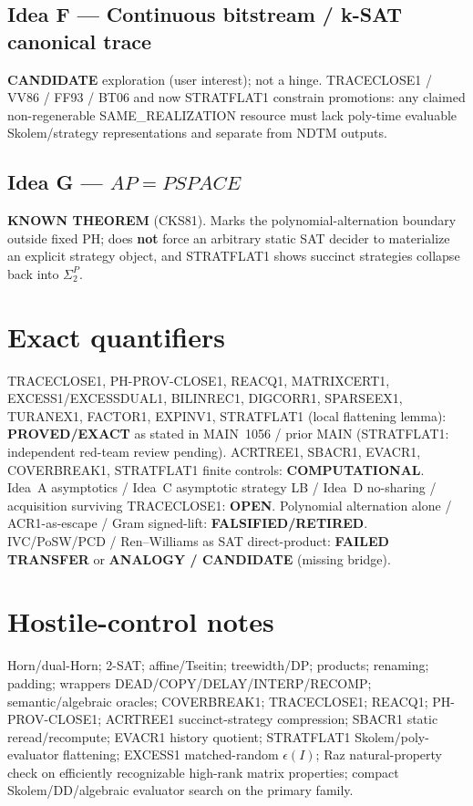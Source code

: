 \documentclass[11pt]{article}
\begin{document}
\subsection*{Idea F --- Continuous bitstream / k-SAT canonical trace}
\textbf{CANDIDATE} exploration (user interest); not a hinge. TRACECLOSE1 / VV86 / FF93 / BT06
and now STRATFLAT1 constrain promotions: any claimed non-regenerable SAME\_REALIZATION resource
must lack poly-time evaluable Skolem/strategy representations and separate from NDTM outputs.

\subsection*{Idea G --- $AP=PSPACE$}
\textbf{KNOWN THEOREM} (CKS81). Marks the polynomial-alternation boundary outside fixed PH;
does \textbf{not} force an arbitrary static SAT decider to materialize an explicit strategy object,
and STRATFLAT1 shows succinct strategies collapse back into $\Sigma_2^P$.

\section*{Exact quantifiers}
TRACECLOSE1, PH-PROV-CLOSE1, REACQ1, MATRIXCERT1, EXCESS1/EXCESSDUAL1, BILINREC1, DIGCORR1,
SPARSEEX1, TURANEX1, FACTOR1, EXPINV1, STRATFLAT1 (local flattening lemma): \textbf{PROVED/EXACT}
as stated in MAIN~1056 / prior MAIN (STRATFLAT1: independent red-team review pending).
ACRTREE1, SBACR1, EVACR1, COVERBREAK1, STRATFLAT1 finite controls: \textbf{COMPUTATIONAL}.
Idea~A asymptotics / Idea~C asymptotic strategy LB / Idea~D no-sharing / acquisition surviving
TRACECLOSE1: \textbf{OPEN}.
Polynomial alternation alone / ACR1-as-escape / Gram signed-lift: \textbf{FALSIFIED/RETIRED}.
IVC/PoSW/PCD / Ren--Williams as SAT direct-product: \textbf{FAILED TRANSFER} or
\textbf{ANALOGY / CANDIDATE} (missing bridge).

\section*{Hostile-control notes}
Horn/dual-Horn; 2-SAT; affine/Tseitin; treewidth/DP; products; renaming; padding;
wrappers DEAD/COPY/DELAY/INTERP/RECOMP; semantic/algebraic oracles; COVERBREAK1;
TRACECLOSE1; REACQ1; PH-PROV-CLOSE1; ACRTREE1 succinct-strategy compression; SBACR1
static reread/recompute; EVACR1 history quotient; STRATFLAT1 Skolem/poly-evaluator flattening;
EXCESS1 matched-random $\epsilon(I)$; Raz natural-property check on efficiently recognizable
high-rank matrix properties; compact Skolem/DD/algebraic evaluator search on the primary family.
\end{document}
